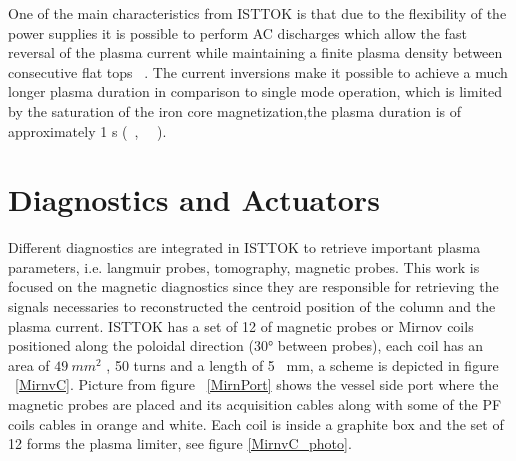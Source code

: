 One of the main characteristics from ISTTOK  is that due to the flexibility of the power supplies it is possible  to perform  AC  discharges  which  allow the fast reversal of the plasma current while maintaining a finite plasma density between consecutive flat tops  ~\cite{density}. The current inversions make it possible to achieve a much longer plasma duration in comparison to single mode operation, which is limited by the saturation of the iron core magnetization,the plasma duration is of approximately 1 s (~\cite{Fernandes1998}, ~\cite{Carvalho2015}~).







\section{Diagnostics and Actuators}

Different  diagnostics are integrated in ISTTOK to retrieve important plasma parameters, i.e. langmuir probes, tomography, magnetic probes. This work is focused on the magnetic diagnostics  since they are responsible for  retrieving the signals necessaries to reconstructed the centroid position of the column and the plasma current. ISTTOK has a set of 12 of magnetic  probes or Mirnov coils positioned along the poloidal direction (30° between  probes), each coil has an area of $49 ~mm^2$ , 50 turns and a length of 5 ~mm, a scheme is depicted in figure ~\ref{MirnvC}. Picture from figure ~\ref{MirnPort} shows the vessel side port where the magnetic probes are  placed and its acquisition cables along with some of the PF coils cables in orange and white. Each coil is inside a graphite box and the set of 12 forms the plasma limiter, see figure \ref{MirnvC_photo}. 
\smallskip



